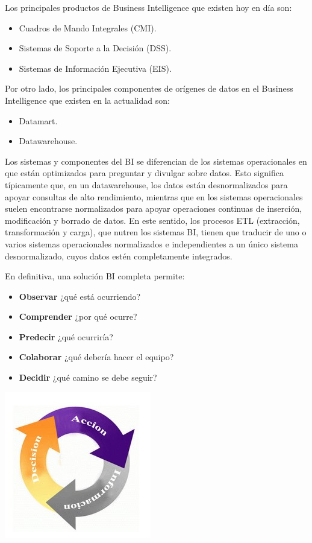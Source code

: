 Los principales productos de Business Intelligence que existen hoy en día son:

\begin{itemize}
\item Cuadros de Mando Integrales (CMI).
\item Sistemas de Soporte a la Decisión (DSS).
\item Sistemas de Información Ejecutiva (EIS).
\end{itemize}

Por otro lado, los principales componentes de orígenes de datos en el Business Intelligence que existen en la actualidad son:

\begin{itemize}
\item Datamart.
\item Datawarehouse.
\end{itemize}

Los sistemas y componentes del BI se diferencian de los sistemas operacionales en que están optimizados para preguntar y divulgar sobre datos. Esto significa típicamente que, en un datawarehouse, los datos están desnormalizados para apoyar consultas de alto rendimiento, mientras que en los sistemas operacionales suelen encontrarse normalizados para apoyar operaciones continuas de inserción, modificación y borrado de datos. En este sentido, los procesos ETL (extracción, transformación y carga), que nutren los sistemas BI, tienen que traducir de uno o varios sistemas operacionales normalizados e independientes a un único sistema desnormalizado, cuyos datos estén completamente integrados.\newline

En definitiva, una solución BI completa permite:

\begin{itemize}
\item \textbf{Observar} ¿qué está ocurriendo?
\item \textbf{Comprender} ¿por qué ocurre?
\item \textbf{Predecir} ¿qué ocurriría?
\item \textbf{Colaborar} ¿qué debería hacer el equipo?
\item \textbf{Decidir} ¿qué camino se debe seguir?\newline
\end{itemize}

\begin{center}
\includegraphics{images/bi/bi-dai}\newline
\end{center}


